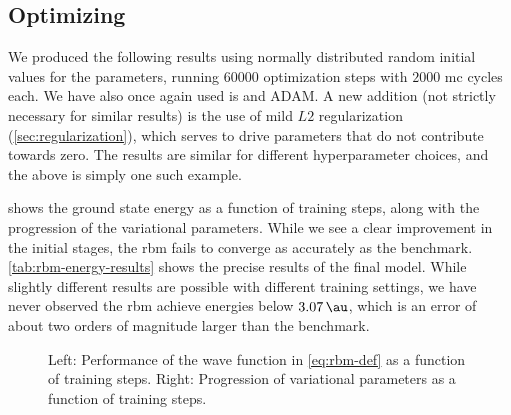 \documentclass[Thesis.tex]{subfiles}
\begin{document}
\subsection{Optimizing}

We produced the following results using normally distributed random
initial values for the parameters, running $\num{60000}$ optimization steps with
$\num{2000}$ \gls{mc} cycles each. We have also once again used \acrlong{is}
and ADAM\@. A new addition (not strictly necessary for similar results) is the use
of mild $L2$ regularization (\cref{sec:regularization}), which serves to drive parameters that do not
contribute towards zero. The results are similar for different hyperparameter
choices, and the above is simply one such example.

 shows the ground state energy as a function of
training steps, along with the progression of the variational
parameters. While we see a clear improvement in the initial stages, the \gls{rbm}
fails to converge as accurately as the benchmark. \cref{tab:rbm-energy-results}
shows the precise results of the final model. While slightly different results
are possible with different training settings, we have never observed the \gls{rbm}
achieve energies below $\SI{3.07}{\au}$, which is an error of about two orders
of magnitude larger than the benchmark.



\begin{figure}[h]
   \centering
    \resizebox{\linewidth}{!}{%
        
    }
    \caption[Learning progression of an \acrshort{rbm} on quantum dots]{\label{fig:QD-rbm-training}Left: Performance of the
      wave function in \cref{eq:rbm-def} as a function of
      training steps. Right: Progression of variational parameters as a function
      of training steps.}
\end{figure}

\begin{table}[h]
  \centering
  \caption[Energy estimates using an \gls{rbm} on quantum dots]{Energy using the \gls{rbm} wave function in~\cref{eq:rbm-def}, along with
the same wave function using input sorting to impose symmetry. Results obtained
from $2^{23}$ samples and errors estimated by an automated blocking
algorithm by~\textcite{Jonsson-2018}. Energies in atomic units $[\si{\au}]$. See
\cref{fig:QD-rbm-training} for source code reference.}
  
  \label{tab:rbm-energy-results}
\end{table}
\end{document}
